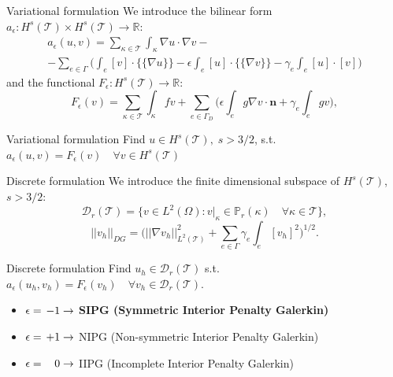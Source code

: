 \documentclass{beamer}
\begin{document}
\begin{frame}{Variational formulation}
	We introduce the bilinear form
	$a_\epsilon: H^s(\mathcal{T}) \times H^s(\mathcal{T}) \rightarrow
	\mathbb{R}$:
	\begin{multline*}
	a_\epsilon(u, v) = \sum_{\kappa \in \mathcal{T}} \int_\kappa \nabla u \cdot
	\nabla v -\\
	-\sum_{e \in \Gamma} \bigg( \int_e [v] \cdot \{\!\!\{ \nabla u \}\!\!\}
	-\epsilon \int_e [u] \cdot \{\!\!\{ \nabla v \}\!\!\}
	- \gamma_e \int_e [u]\cdot[v] \bigg)
	\end{multline*}
	and the functional $F_\epsilon: H^s(\mathcal{T}) \rightarrow \mathbb{R}$:
	\begin{equation*}
	F_\epsilon(v) = \sum_{\kappa \in \mathcal{T}} \int_\kappa fv
	+ \sum_{e \in \Gamma_D} \bigg( \epsilon \int_e g \nabla v \cdot \mathbf{n}
	+ \gamma_e \int_e gv \bigg),
	\end{equation*}
	\begin{block}{Variational formulation}
	Find $u \in H^s(\mathcal{T}), \; s>3/2$, s.t. $a_\epsilon(u, v) =
	F_\epsilon(v) \quad \forall v \in H^s(\mathcal{T})$
	\end{block}

\end{frame}
\begin{frame}{Discrete formulation}
	We introduce the finite dimensional subspace of $H^s(\mathcal{T})$, $s>3/2$:
	\begin{equation*}
	\mathcal{D}_r(\mathcal{T}) = \{ v \in L^2(\Omega) : v|_\kappa \in
	\mathbb{P}_r(\kappa) \quad \forall \kappa \in \mathcal{T}  \},
	\end{equation*}
	\begin{equation*}
		|\!|v_h|\!|_{DG} = \bigg( |\!|\nabla v_h|\!|^2_{L^2(\mathcal{T})} +
		\sum_{e \in \Gamma} \gamma_e \int_e [v_h]^2 \bigg)^{1/2}.
	\end{equation*}
	\begin{block}{Discrete formulation}
	Find $u_h \in \mathcal{D}_r(\mathcal{T})$ s.t. $a_\epsilon(u_h, v_h) =
	F_\epsilon(v_h) \quad \forall v_h \in \mathcal{D}_r(\mathcal{T})$.
	\end{block}
	\begin{itemize}
		\item $\epsilon = \makebox[0.5cm][r]{$-1$} \rightarrow$ \textbf{SIPG 
		(Symmetric Interior Penalty Galerkin)}
		\item $\epsilon = \makebox[0.5cm][r]{$+1$} \rightarrow$ NIPG 
		(Non-symmetric Interior Penalty	Galerkin)
		\item $\epsilon = \makebox[0.5cm][r]{$0$} \rightarrow$ IIPG (Incomplete 
		Interior Penalty
		Galerkin)
	\end{itemize}
\end{frame}
\end{document}
